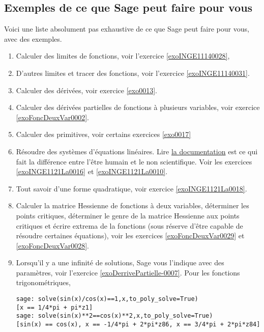 \subsection{Exemples de ce que Sage peut faire pour vous}

Voici une liste absolument pas exhaustive de ce que Sage peut faire pour vous, avec des exemples. 
\begin{enumerate}

	\item
		Calculer des limites de fonctions, voir l'exercice \ref{exoINGE11140028},

	\item
		D'autres limites et tracer des fonctions, voir l'exercice \ref{exoINGE11140031}.
	\item
		Calculer des dérivées, voir exercice \ref{exo0013}.
	\item
		Calculer des dérivées partielles de fonctions à plusieurs variables, voir exercice \ref{exoFoncDeuxVar0002}.
	\item
		Calculer des primitives, voir certains exercices \ref{exo0017}
	\item

		Résoudre des systèmes d'équations linéaires. Lire \href{http://www.sagemath.org/doc/constructions/linear_algebra.html#solving-systems-of-linear-equations}{la documentation} est ce qui fait la différence entre l'être humain et le non scientifique. Voir les exercices  \ref{exoINGE1121La0016} et \ref{exoINGE1121La0010}.

	\item
		Tout savoir d'une forme quadratique, voir exercice \ref{exoINGE1121La0018}.
	\item
		Calculer la matrice Hessienne de fonctions à deux variables, déterminer les points critiques, déterminer le genre de la matrice Hessienne aux points critiques et écrire extrema de la fonctions (sous réserve d'être capable de résoudre certaines équations), voir les exercices \ref{exoFoncDeuxVar0029} et \ref{exoFoncDeuxVar0028}.
	\item
		Lorsqu'il y a une infinité de solutions, Sage vous l'indique avec des paramètres, voir l'exercice \ref{exoDerrivePartielle-0007}. Pour les fonctions trigonométriques, 
        \begin{verbatim}
sage: solve(sin(x)/cos(x)==1,x,to_poly_solve=True)                                                         
[x == 1/4*pi + pi*z1]
sage: solve(sin(x)**2==cos(x)**2,x,to_poly_solve=True)
[sin(x) == cos(x), x == -1/4*pi + 2*pi*z86, x == 3/4*pi + 2*pi*z84]
        \end{verbatim}


\end{enumerate}
